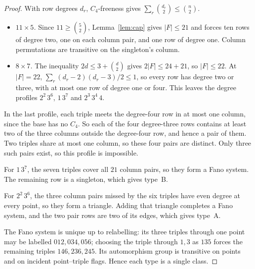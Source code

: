 \begin{proof}
With row degrees $d_r$, $C_4$-freeness gives
$\sum_r\binom{d_r}2\le\binom n2$.
\begin{itemize}
\item \emph{$11\times5$.} Since $11\ge\binom52$, Lemma~\ref{lem:cap} gives
  $|F|\le21$ and forces ten rows of degree two, one on each column pair,
  and one row of degree one. Column permutations are transitive on the
  singleton's column.
\item \emph{$8\times7$.} The inequality $2d\le3+\binom d2$ gives
  $2|F|\le24+21$, so $|F|\le22$. At $|F|=22$, $\sum_r(d_r-2)(d_r-3)/2\le1$,
  so every row has degree two or three, with at most one row of degree one
  or four. This leaves the degree profiles $2^2\,3^6$, $1\,3^7$ and
  $2^3\,3^4\,4$.
\end{itemize}
In the last profile, each triple meets the degree-four row in at most one
column, since the base has no $C_4$. So each of the four degree-three
rows contains at least two of the three columns outside the degree-four
row, and hence a pair of them. Two triples share at most one column, so
these four pairs are distinct. Only three such pairs exist, so this
profile is impossible.

For $1\,3^7$, the seven triples cover all $21$ column pairs, so they form
a Fano system. The remaining row is a singleton, which gives type~B.

For $2^2\,3^6$, the three column pairs missed by the six triples have even
degree at every point, so they form a triangle. Adding that triangle
completes a Fano system, and the two pair rows are two of its edges,
which gives type~A.

The Fano system is unique up to relabelling: its three triples through
one point may be labelled $012,034,056$; choosing the triple through
$1,3$ as $135$ forces the remaining triples $146,236,245$.
Its automorphism group is transitive on points and on incident
point--triple flags. Hence each type is a single class.
\end{proof}

